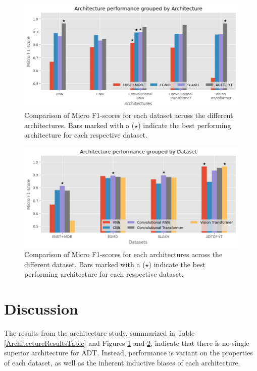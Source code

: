 \begin{figure}[H]
    \centering
    \hspace*{-0.8cm}
    \includegraphics[scale=0.8]{figures/architectureperformancearchitecture.png}
    \caption{Comparison of Micro F1-scores for each dataset across the different architectures. Bars marked with a ($\star$) indicate the best performing architecture for each respective dataset.}
    \label{ArchitectureResultsArchitectureFigure}
\end{figure}

\begin{figure}[H]
    \centering
    \hspace*{-0.8cm}
    \includegraphics[scale=0.8]{figures/architectureperformancedataset.png}
    \caption{Comparison of Micro F1-scores for each architectures across the different dataset. Bars marked with a ($\star$) indicate the best performing architecture for each respective dataset.}
    \label{ArchitectureResultsDatasetFigure}
\end{figure}

\section{Discussion}

The results from the architecture study, summarized in Table \ref{ArchitectureResultsTable} and Figures \ref{ArchitectureResultsArchitectureFigure} and \ref{ArchitectureResultsDatasetFigure}, indicate that there is no single superior architecture for \acrfull{ADT}. Instead, performance is variant on the properties of each dataset, as well as the inherent inductive biases of each architecture.

